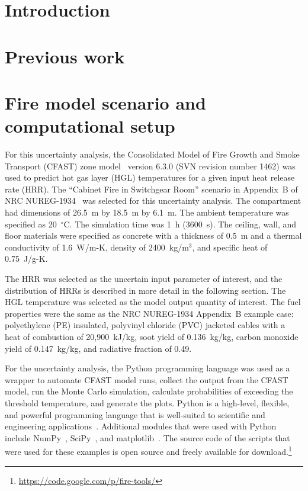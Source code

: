 \documentclass[12pt]{article}
\begin{document}
\section{Introduction}
\label{sec:introduction}


\section{Previous work}
\label{sec:previous_work}





\section{Fire model scenario and computational setup}
\label{sec:fire_model_scenario_setup}

For this uncertainty analysis, the Consolidated Model of Fire Growth and Smoke Transport (CFAST) zone model~\cite{CFAST_Users_Guide_6} version 6.3.0 (SVN revision number 1462) was used to predict hot gas layer (HGL) temperatures for a given input heat release rate (HRR). The ``Cabinet Fire in Switchgear Room'' scenario in Appendix~B of NRC NUREG-1934~\cite{NUREG_1934} was selected for this uncertainty analysis. The compartment had dimensions of 26.5~m by 18.5~m by 6.1~m. The ambient temperature was specified as 20~$^\circ$C. The simulation time was 1~h (3600~s). The ceiling, wall, and floor materials were specified as concrete with a thickness of 0.5~m and a thermal conductivity of 1.6~W/m-K, density of 2400~kg/m$^3$, and specific heat of 0.75~J/g-K.

The HRR was selected as the uncertain input parameter of interest, and the distribution of HRRs is described in more detail in the following section. The HGL temperature was selected as the model output quantity of interest. The fuel properties were the same as the NRC NUREG-1934 Appendix~B example case: polyethylene (PE) insulated, polyvinyl chloride (PVC) jacketed cables with a heat of combustion of 20,900~kJ/kg, soot yield of 0.136~kg/kg, carbon monoxide yield of 0.147~kg/kg, and radiative fraction of 0.49.

For the uncertainty analysis, the Python programming language was used as a wrapper to automate CFAST model runs, collect the output from the CFAST model, run the Monte Carlo simulation, calculate probabilities of exceeding the threshold temperature, and generate the plots. Python is a high-level, flexible, and powerful programming language that is well-suited to scientific and engineering applications~\cite{Oliphant:2007}. Additional modules that were used with Python include NumPy~\cite{oliphant2006guide}, SciPy~\cite{Jones:2001fk}, and matplotlib~\cite{Hunter:2007}. The source code of the scripts that were used for these examples is open source and freely available for download.\footnote{\url{https://code.google.com/p/fire-tools/}}
\end{document}
